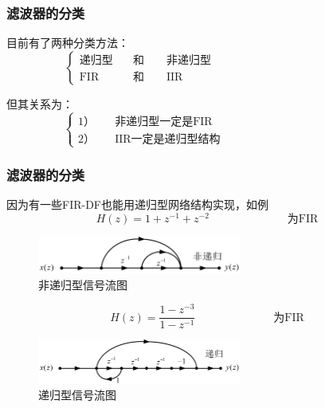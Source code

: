 \documentclass[notheorems,compress,mathserif,table]{beamer}
\newtheorem{example}{例题}
\begin{document}
\begin{frame}\frametitle{滤波器的分类}%
\par 目前有了两种分类方法：
$$
\left\{ \begin{aligned}
\mbox{递归型} &\quad   \mbox{和$\quad\quad$非递归型} \quad\quad\quad\quad\quad\quad\quad\quad\quad\quad\quad\quad\\
\mbox{FIR} &\quad \mbox{和$\quad\quad$IIR}
\end{aligned} \right.
$$

但其关系为：
$$
\left\{ \begin{aligned}
\mbox{1）} &\quad \mbox{非递归型一定是FIR} \quad\quad\quad\quad\quad\quad\quad\quad\quad\quad\quad\quad\\
\mbox{2）} &\quad \mbox{IIR一定是递归型结构}
\end{aligned} \right.
$$
\end{frame}
\begin{frame}[shrink]\frametitle{滤波器的分类}%
\par 因为有一些FIR-DF也能用递归型网络结构实现，如例%
\label{exam:chp5exam5} $$H(z)=1+z^{-1}+z^{-2}\quad\quad\quad\quad\quad\quad\quad\mbox{为FIR}$$
\begin{figure}[h]
\centering
\includegraphics[width=0.6\textwidth]{firfeidigui.jpg}
\caption{非递归型信号流图}
\label{chp5:jibenliutu}
\end{figure}
\vspace{-0.5cm}
\par
$$H(z)=\frac{1-z^{-3}}{1-z^{-1}}\quad\quad\quad\quad\quad\quad\quad\mbox{为FIR}$$
\vspace{-0.3cm}
\begin{figure}[h]
\centering
\includegraphics[width=0.6\textwidth]{firdigui.jpg}
\caption{递归型信号流图}
\label{chp5:jibenliutu}
\end{figure}
\vspace{-0.3cm}
\end{frame}
\end{document}
